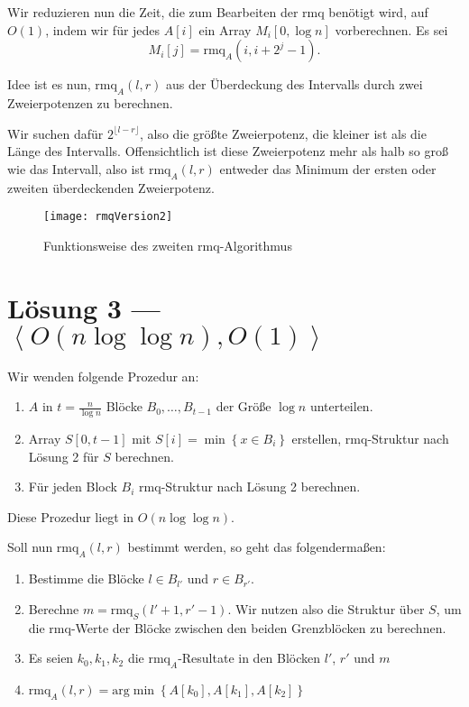 Wir reduzieren nun die Zeit, die zum Bearbeiten der rmq benötigt wird, auf \( O(1) \), indem wir für jedes \( A[i] \) ein Array \( M_i[0,\log n] \) vorberechnen. Es sei
\begin{equation*}
  M_i[j] = \text{rmq}_A(i,i+2^j-1)\text{.}
\end{equation*}

Idee ist es nun, \( \text{rmq}_A(l,r) \) aus der Überdeckung des Intervalls durch zwei Zweierpotenzen zu berechnen.

Wir suchen dafür \( 2^{\lfloor l - r \rfloor} \), also die größte Zweierpotenz, die kleiner ist als die Länge des Intervalls. Offensichtlich ist diese Zweierpotenz mehr als halb so groß wie das Intervall, also ist \( \text{rmq}_A(l,r) \) entweder das Minimum der ersten oder zweiten überdeckenden Zweierpotenz.

\begin{figure}[H]
  \texttt{[image: rmqVersion2]}
  \caption{Funktionsweise des zweiten rmq-Algorithmus}
\end{figure}

\section{Lösung 3 --- \( \left\langle O(n \log \log n), O(1) \right\rangle \)}

Wir wenden folgende Prozedur an:

\begin{enumerate}
  \item \( A \) in \( t = \frac{n}{\log n} \) Blöcke \( B_0, \dots, B_{t-1} \) der Größe \( \log n \) unterteilen.
  \item Array \( S[0,t-1] \) mit \( S[i] = \min\left \{ x \in B_i \right \} \) erstellen, rmq-Struktur nach Lösung 2 für \( S \) berechnen.
  \item Für jeden Block \( B_i \) rmq-Struktur nach Lösung 2 berechnen.
\end{enumerate}

Diese Prozedur liegt in \( O(n \log \log n) \).

Soll nun \( \text{rmq}_A(l,r) \) bestimmt werden, so geht das folgendermaßen:

\begin{enumerate}
  \item Bestimme die Blöcke \( l \in B_{l'} \) und \( r \in B_{r'} \).
  \item Berechne \( m = \text{rmq}_S(l'+1, r'-1) \). Wir nutzen also die Struktur über \( S \), um die rmq-Werte der Blöcke zwischen den beiden Grenzblöcken zu berechnen.
  \item Es seien \( k_0,k_1,k_2 \) die \( \text{rmq}_A \)-Resultate in den Blöcken \( l' \), \( r' \) und \( m \)
  \item \( \text{rmq}_A(l,r) = \text{arg}\min \left \{ A[k_0],A[k_1],A[k_2] \right \} \)
\end{enumerate}

